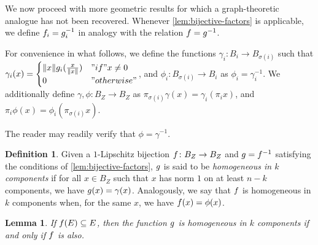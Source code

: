 \documentclass{amsart}
\newtheorem{lemma}{Lemma}[section]
\theoremstyle{definition}
\newtheorem{definition}{Definition}[section]
\begin{document}
We now proceed with more geometric results for which a graph-theoretic analogue has not been recovered. Whenever \autoref{lem:bijective-factors} is applicable, we define $f_i = g_i^{-1}$ in analogy with the relation $f = g^{-1}$.

For convenience in what follows, we define the functions $\gamma_i  \colon B_i \to B_{\sigma(i)}$ such that
$\gamma_i (x) =
\begin{cases}\norm{x} g_i (\frac{x}{\norm{x}}) &"if" x \neq 0\\ 0 &"otherwise"\end{cases}$, and $\phi_i \colon B_{\sigma(i)} \to B_i$ as $\phi_i = \gamma_i^{-1}$. We additionally define
$\gamma, \phi \colon B_Z \to B_Z$ as $\pi_{\sigma(i)} \gamma(x) = \gamma_i (\pi_i x)$, and
$\pi_i \phi(x) = \phi_i (\pi_{\sigma(i)} x)$.

The reader may readily verify that $\phi = \gamma^{-1}$.

\begin{definition} 

  Given a $1$-Lipschitz bijection $f \colon B_Z \to B_Z$ and $g = f^{-1}$ satisfying the conditions of \autoref{lem:bijective-factors}, $g$ is said to be \textit{homogeneous in $k$ components} if for all $x \in B_Z$ such that $x$ has norm $1$ on at least $n-k$ components, we have $g(x) = \gamma(x)$. Analogously, we say that $f$ is homogeneous in $k$ components when, for the same $x$, we have $f(x) = \phi(x)$.
\end{definition}

\begin{lemma} \label{lem:homogeneity-equiv}
\annotation
  If $f(E) \subseteq E$, then
  the function $g$ is homogeneous in $k$ components if and only if
  $f$ is also.
\end{lemma}
\end{document}
